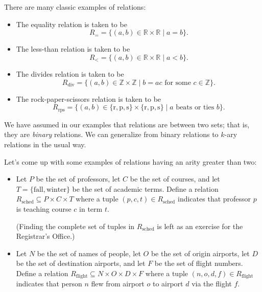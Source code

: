 \begin{example}\label{ex:relationexamples}
There are many classic examples of relations:
\begin{itemize}
\item The equality relation is taken to be
\begin{equation*}
R_{=} = \{(a,b) \in \mathbb{R} \times \mathbb{R} \mid a = b\}.
\end{equation*}
\item The less-than relation is taken to be
\begin{equation*}
R_{<} = \{(a,b) \in \mathbb{R} \times \mathbb{R} \mid a < b\}.
\end{equation*}
\item The divides relation is taken to be
\begin{equation*}
R_{\text{div}} = \{(a,b) \in \mathbb{Z} \times \mathbb{Z} \mid b = ac \text{ for some } c \in \mathbb{Z}\}.
\end{equation*}
\item The rock-paper-scissors relation is taken to be
\begin{equation*}
R_{\text{rps}} = \{(a,b) \in \{\text{r}, \text{p}, \text{s}\} \times \{\text{r}, \text{p}, \text{s}\} \mid a \text{ beats or ties } b\}.
\end{equation*}
\end{itemize}
\end{example}

We have assumed in our examples that relations are between two sets; that is, they are \emph{binary} relations. We can generalize from binary relations to $k$-ary relations in the usual way.

\begin{example}
Let's come up with some examples of relations having an arity greater than two:
\begin{itemize}
\item Let $P$ be the set of professors, let $C$ be the set of courses, and let $T = \{\text{fall}, \text{winter}\}$ be the set of academic terms. Define a relation $R_{\text{sched}} \subseteq P \times C \times T$ where a tuple $(p,c,t) \in R_{\text{sched}}$ indicates that professor $p$ is teaching course $c$ in term $t$.

	(Finding the complete set of tuples in $R_{\text{sched}}$ is left as an exercise for the Registrar's Office.)
	
\item Let $N$ be the set of names of people, let $O$ be the set of origin airports, let $D$ be the set of destination airports, and let $F$ be the set of flight numbers. Define a relation $R_{\text{flight}} \subseteq N \times O \times D \times F$ where a tuple $(n, o, d, f) \in R_{\text{flight}}$ indicates that person $n$ flew from airport $o$ to airport $d$ via the flight $f$.
\end{itemize}
\end{example}

